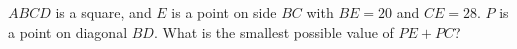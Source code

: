 $ABCD$ is a square, and $E$ is a point on side $BC$ with $BE=20$ and $CE=28$. $P$ is a point on diagonal $BD$. What is the smallest possible value of $PE+PC$?
